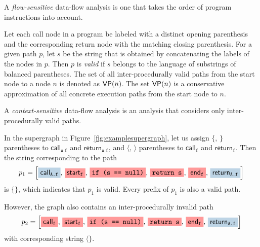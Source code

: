 A \textit{flow-sensitive} data-flow analysis is one that takes the order of program instructions into account.

Let each call node in a program be labeled with a distinct opening parenthesis and the corresponding return node with the matching closing parenthesis. For a given path $p$, let $s$ be the string that is obtained by concatenating the labels of the nodes in $p$.
Then $p$ is \textit{valid} if $s$ belongs to the language of substrings of balanced parentheses. The set of all inter-procedurally valid paths from the start node to a node $n$ is denoted as $\textsf{VP}(n)$. The set $\textsf{VP}(n)$ is a conservative approximation of all concrete execution paths from the start node to $n$.

A \textit{context-sensitive} data-flow analysis is an analysis that considers only inter-procedurally valid paths.

\begin{mdelete}
\begin{example}
  In the supergraph in Figure~\ref{fig:examplesupergraph}, let us assign $\{,\,\}$ parentheses to $\textsf{call}_\texttt{A.f}$ and $\textsf{return}_\texttt{A.f}$, and $\langle,\,\rangle$ parentheses to $\textsf{call}_\texttt{f}$ and $\textsf{return}_\texttt{f}$. 
  Then the string corresponding to the path 
  \[
    p_1=\left[\highlight{\textsf{call}_\texttt{A.f}}{greyblue},\,
          \highlight{\textsf{start}_\texttt{f}}{lightsalmonpink},\,
          \highlight{\texttt{if (s == null)}}{lightsalmonpink},\,
          \highlight{\texttt{return s}}{lightsalmonpink},\,
          \highlight{\textsf{end}_\texttt{f}}{lightsalmonpink},\,
          \highlight{\textsf{return}_\texttt{A.f}}{greyblue}
    \right]
  \]
  is $\{\}$, which indicates that $p_1$ is valid. Every prefix of $p_1$ is also a valid path.
  
  
However, the graph also contains an inter-procedurally invalid path
  \[
    p_2=\left[\highlight{\textsf{call}_\texttt{f}}{lightsalmonpink},\,
          \highlight{\textsf{start}_\texttt{f}}{lightsalmonpink},\,
          \highlight{\texttt{if (s == null)}}{lightsalmonpink},\,
          \highlight{\texttt{return s}}{lightsalmonpink},\,
          \highlight{\textsf{end}_\texttt{f}}{lightsalmonpink},\,
          \highlight{\textsf{return}_\texttt{A.f}}{greyblue}
    \right]
  \]
  with corresponding string $\langle\}$.
\end{example}
\end{mdelete}

